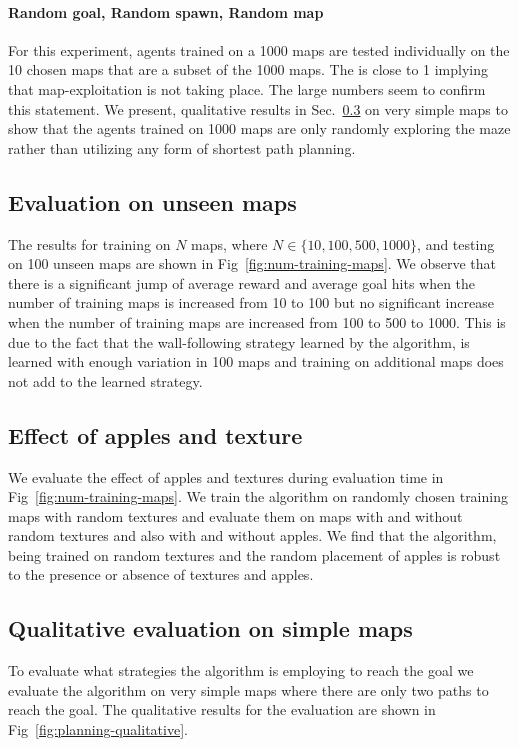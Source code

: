\paragraph{Random goal, Random spawn, Random map}
For this experiment, agents trained on a 1000 maps are tested individually on the 10 chosen maps that are a subset of the 1000 maps.
The \LatencyOneGtOne{} is close to 1 implying that map-exploitation is not taking place.
The large \DistanceInefficiency{} numbers seem to confirm this statement.
We present, qualitative results in  Sec.~\ref{sec:qualitative-simple} on very simple maps to show that the agents trained on 1000 maps are only randomly exploring the maze rather than utilizing any form of shortest path planning.

\subsection{Evaluation on unseen maps}
The results for training on $N$ maps, where $N \in \{10, 100, 500, 1000\}$, and testing on 100 unseen maps are shown in Fig~\ref{fig:num-training-maps}.
We observe that there is a significant jump of average reward and average goal hits when the number of training maps is increased from 10 to 100 but no significant increase when the number of training maps are increased from 100 to 500 to 1000.
This is due to the fact that the wall-following strategy learned by the algorithm,
is learned with enough variation in 100 maps and training on additional maps does not add to the learned strategy.

\subsection{Effect of apples and texture}
We evaluate the effect of apples and textures during evaluation time in Fig~\ref{fig:num-training-maps}.
We train the algorithm on randomly chosen training maps with random textures and evaluate them on maps with and without random textures and also with and without apples. 
We find that the algorithm, being trained on random textures and the random placement of apples is robust to the presence or absence of textures and apples.


\subsection{Qualitative evaluation on simple maps}
\label{sec:qualitative-simple}
To evaluate what strategies the algorithm is employing to reach the
goal we evaluate the algorithm on very simple maps where there are only two
paths to reach the goal. The qualitative results for the evaluation are shown
in Fig~\ref{fig:planning-qualitative}.


